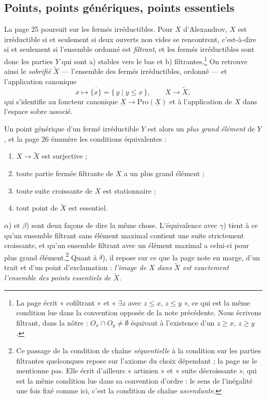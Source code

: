\documentclass[11pt,a4paper]{article}
\begin{document}
\subsection*{Points, points génériques, points essentiels}

La page 25 poursuit sur les fermés irréductibles. Pour $X$ d'Alexandrov, $X$
est irréductible si et seulement si deux ouverts non vides se rencontrent,
c'est-à-dire si et seulement si l'ensemble ordonné est \emph{filtrant}, et les
fermés irréductibles sont donc les parties $Y$ qui sont a) stables vers le bas
et b) filtrantes.\footnote{La page écrit « cofiltrant » et « $\exists z$ avec
$z \leq x$, $z \leq y$ », ce qui est la même condition lue dans la convention
opposée de la note précédente. Nous écrivons filtrant, dans la nôtre :
$O_{x} \cap O_{y} \neq \emptyset$ équivaut à l'existence d'un $z \geq x$,
$z \geq y$.} On retrouve ainsi le \emph{sobrifié} $\widetilde{X}$ — l'ensemble
des fermés irréductibles, ordonné — et l'application canonique
\[
x \longmapsto \overline{\{x\}} = \{\, y \mid y \leq x \,\},
\qquad X \longrightarrow \widetilde{X},
\]
qui s'identifie au foncteur canonique $\underline{X} \to
\mathrm{Pro}(\underline{X})$ et à l'application de $X$ dans l'espace sobre
associé.

Un point générique d'un fermé irréductible $Y$ est alors un \emph{plus grand
élément} de $Y$, et la page 26 énumère les conditions équivalentes :

\begin{enumerate}
\item[$\alpha$)] $X \to \widetilde{X}$ est surjective ;
\item[$\beta$)] toute partie fermée filtrante de $X$ a un plus grand élément ;
\item[$\gamma$)] toute suite croissante de $X$ est stationnaire ;
\item[$\delta$)] tout point de $\widetilde{X}$ est essentiel.
\end{enumerate}

$\alpha$) et $\beta$) sont deux façons de dire la même chose. L'équivalence
avec $\gamma$) tient à ce qu'un ensemble filtrant sans élément maximal
contient une suite strictement croissante, et qu'un ensemble filtrant avec un
élément maximal a celui-ci pour plus grand élément.\footnote{Ce passage de la
condition de chaîne \emph{séquentielle} à la condition sur les parties
filtrantes quelconques repose sur l'axiome du choix dépendant ; la page ne le
mentionne pas. Elle écrit d'ailleurs « artinien » et « suite décroissante »,
qui est la même condition lue dans sa convention d'ordre : le sens de
l'inégalité une fois fixé comme ici, c'est la condition de chaîne
\emph{ascendante}.} Quant à $\delta$), il repose sur ce que la page note en
marge, d'un trait et d'un point d'exclamation : \emph{l'image de $X$ dans
$\widetilde{X}$ est exactement l'ensemble des points essentiels de
$\widetilde{X}$}.
\end{document}
